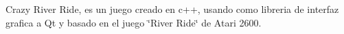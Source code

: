 Crazy River Ride, es un juego creado en c++, usando como libreria de interfaz grafica a Qt y basado en el juego \char`\"{}\-River Ride\char`\"{} de Atari 2600. 